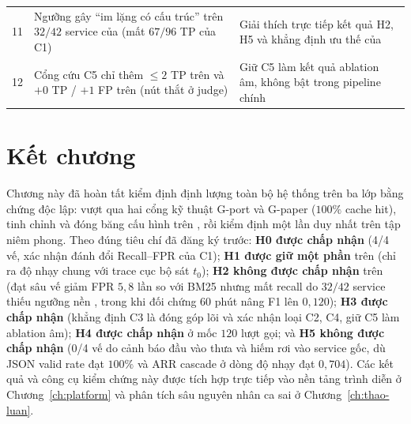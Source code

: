 \begin{table}[htbp]
\begin{tabularx}{\linewidth}{@{}r Y >{\raggedright\arraybackslash}p{4.2cm}@{}}
    11 & Ngưỡng  gây ``im lặng có cấu trúc'' trên $32/42$ service của  (mất $67/96$ TP của C1) & Giải thích trực tiếp kết quả H2, H5 và khẳng định ưu thế của  \\
    12 & Cổng cứu C5 chỉ thêm $\le 2$ TP trên  và $+0$ TP / $+1$ FP trên  (nút thắt ở judge) & Giữ C5 làm kết quả ablation âm, không bật trong pipeline chính \\
    \bottomrule
  \end{tabularx}
\end{table}

\section{Kết chương}
\label{sec:ch5-ket-chuong}

Chương này đã hoàn tất kiểm định định lượng toàn bộ hệ thống trên ba lớp bằng chứng độc lập: vượt qua hai cổng kỹ thuật G-port và G-paper ($100\%$ cache hit), tinh chỉnh và đóng băng cấu hình trên , rồi kiểm định một lần duy nhất trên tập  niêm phong. Theo đúng tiêu chí đã đăng ký trước: \textbf{H0 được chấp nhận} (4/4 vế, xác nhận đánh đổi Recall--FPR của C1); \textbf{H1 được giữ một phần} trên  (chỉ ra độ nhạy chung với trace cục bộ sát $t_0$); \textbf{H2 không được chấp nhận} trên  (đạt sâu vế giảm FPR $5{,}8$ lần so với BM25 nhưng mất recall do $32/42$ service thiếu ngưỡng nền , trong khi đối chứng  60 phút nâng F1 lên $0{,}120$); \textbf{H3 được chấp nhận} (khẳng định C3 là đóng góp lõi và xác nhận loại C2, C4, giữ C5 làm ablation âm); \textbf{H4 được chấp nhận} ở mốc $120$ lượt gọi; và \textbf{H5 không được chấp nhận} (0/4 vế do cảnh báo đầu vào thưa và hiếm rơi vào service gốc, dù JSON valid rate đạt $100\%$ và ARR cascade ở dòng độ nhạy đạt $0{,}704$). Các kết quả và công cụ kiểm chứng này được tích hợp trực tiếp vào nền tảng trình diễn ở Chương~\ref{ch:platform} và phân tích sâu nguyên nhân ca sai ở Chương~\ref{ch:thao-luan}.
